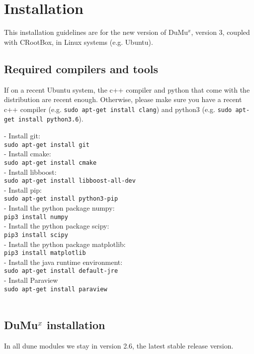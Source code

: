 \chapter*{Installation}
This installation guidelines are for the new version of DuMu$^{x}$, version 3, coupled with CRootBox, in Linux systems (e.g. Ubuntu). 

\section*{Required compilers and tools}
%
If on a recent Ubuntu system, the c++ compiler and python that come with the distribution are recent enough. Otherwise, please make sure you have a recent c++ compiler (e.g. \lstinline{sudo apt-get install clang}) and python3 (e.g. \lstinline{sudo apt-get install python3.6}). 

- Install git: \\
\lstinline{sudo apt-get install git}\\
- Install cmake:\\
\lstinline{sudo apt-get install cmake}\\
- Install libboost:\\
\lstinline{sudo apt-get install libboost-all-dev}\\
- Install pip:\\
\lstinline{sudo apt-get install python3-pip}\\
- Install the python package numpy:\\
\lstinline{pip3 install numpy}\\
- Install the python package scipy:\\
\lstinline{pip3 install scipy}\\
- Install the python package matplotlib:\\
\lstinline{pip3 install matplotlib}\\
- Install the java runtime environment:\\
\lstinline{sudo apt-get install default-jre}\\
- Install Paraview\\
\lstinline{sudo apt-get install paraview}\\


\lstinline{}\\

\section*{DuMu$^x$ installation}
In all dune modules we stay in version 2.6, the latest stable release version. 

